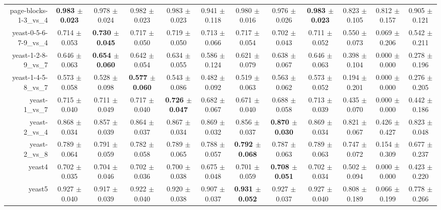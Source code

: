 \begin{table}[!ht]
{\begin{tabular}{r c c c c c c c c c c c}
page-blocks-1-3\_vs\_4 & \textbf{0.983 $\pm$ 0.023} & 0.978 $\pm$ 0.024 & 0.982 $\pm$ 0.023 & 0.983 $\pm$ 0.023 & 0.941 $\pm$ 0.118 & 0.980 $\pm$ 0.016 & 0.976 $\pm$ 0.026 & \textbf{0.983 $\pm$ 0.023} & 0.823 $\pm$ 0.105 & 0.812 $\pm$ 0.157 & 0.905 $\pm$ 0.121 \\
yeast-0-5-6-7-9\_vs\_4 & 0.714 $\pm$ 0.053 & \textbf{0.730 $\pm$ 0.045} & 0.717 $\pm$ 0.050 & 0.719 $\pm$ 0.050 & 0.713 $\pm$ 0.066 & 0.717 $\pm$ 0.054 & 0.702 $\pm$ 0.043 & 0.711 $\pm$ 0.052 & 0.550 $\pm$ 0.073 & 0.069 $\pm$ 0.206 & 0.542 $\pm$ 0.211 \\
yeast-1-2-8-9\_vs\_7 & 0.646 $\pm$ 0.063 & \textbf{0.654 $\pm$ 0.060} & 0.642 $\pm$ 0.054 & 0.634 $\pm$ 0.055 & 0.586 $\pm$ 0.124 & 0.621 $\pm$ 0.079 & 0.638 $\pm$ 0.067 & 0.646 $\pm$ 0.063 & 0.398 $\pm$ 0.104 & 0.000 $\pm$ 0.000 & 0.278 $\pm$ 0.196 \\
yeast-1-4-5-8\_vs\_7 & 0.573 $\pm$ 0.058 & 0.528 $\pm$ 0.098 & \textbf{0.577 $\pm$ 0.060} & 0.543 $\pm$ 0.086 & 0.482 $\pm$ 0.092 & 0.519 $\pm$ 0.063 & 0.563 $\pm$ 0.062 & 0.573 $\pm$ 0.052 & 0.194 $\pm$ 0.201 & 0.000 $\pm$ 0.000 & 0.276 $\pm$ 0.205 \\
yeast-1\_vs\_7 & 0.715 $\pm$ 0.040 & 0.711 $\pm$ 0.049 & 0.717 $\pm$ 0.040 & \textbf{0.726 $\pm$ 0.047} & 0.682 $\pm$ 0.067 & 0.671 $\pm$ 0.040 & 0.688 $\pm$ 0.058 & 0.713 $\pm$ 0.039 & 0.435 $\pm$ 0.070 & 0.000 $\pm$ 0.000 & 0.442 $\pm$ 0.186 \\
yeast-2\_vs\_4 & 0.868 $\pm$ 0.034 & 0.857 $\pm$ 0.039 & 0.864 $\pm$ 0.037 & 0.867 $\pm$ 0.034 & 0.869 $\pm$ 0.032 & 0.856 $\pm$ 0.037 & \textbf{0.870 $\pm$ 0.030} & 0.869 $\pm$ 0.034 & 0.821 $\pm$ 0.067 & 0.426 $\pm$ 0.427 & 0.823 $\pm$ 0.048 \\
yeast-2\_vs\_8 & 0.789 $\pm$ 0.064 & 0.791 $\pm$ 0.059 & 0.782 $\pm$ 0.058 & 0.789 $\pm$ 0.065 & 0.788 $\pm$ 0.057 & \textbf{0.792 $\pm$ 0.068} & 0.787 $\pm$ 0.063 & 0.789 $\pm$ 0.063 & 0.747 $\pm$ 0.072 & 0.154 $\pm$ 0.309 & 0.677 $\pm$ 0.237 \\
yeast4 & 0.702 $\pm$ 0.035 & 0.704 $\pm$ 0.046 & 0.702 $\pm$ 0.036 & 0.700 $\pm$ 0.038 & 0.675 $\pm$ 0.048 & 0.701 $\pm$ 0.059 & \textbf{0.708 $\pm$ 0.051} & 0.702 $\pm$ 0.034 & 0.502 $\pm$ 0.094 & 0.000 $\pm$ 0.000 & 0.423 $\pm$ 0.220 \\
yeast5 & 0.927 $\pm$ 0.040 & 0.917 $\pm$ 0.039 & 0.922 $\pm$ 0.040 & 0.920 $\pm$ 0.038 & 0.907 $\pm$ 0.037 & \textbf{0.931 $\pm$ 0.052} & 0.927 $\pm$ 0.037 & 0.927 $\pm$ 0.040 & 0.808 $\pm$ 0.189 & 0.066 $\pm$ 0.199 & 0.778 $\pm$ 0.266 \\

\end{tabular}}
\end{table}
